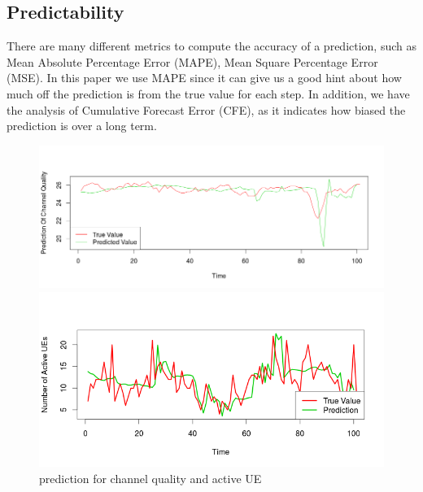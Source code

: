 

\subsection{Predictability}
There are many different metrics to compute the accuracy of a prediction, such as Mean Absolute Percentage Error (MAPE), Mean Square Percentage Error (MSE). In this paper we use MAPE since it can give us a good hint about how much off the prediction is from the true value for each step. In addition, we have the analysis of Cumulative Forecast Error (CFE), as it indicates how biased the prediction is over a long term. 

\begin{figure}[t]

\begin{minipage} {\linewidth}
\centering
 \includegraphics[width=\linewidth]{pictures/prediction.png}
\end{minipage}
\hspace{0.5cm}
\begin{minipage} {\linewidth}
\centering
 \includegraphics[width=\linewidth]{pictures/UE.png}
\end{minipage}

\caption{prediction for channel quality and active UE} \label{fig:prediction}
\end{figure}

